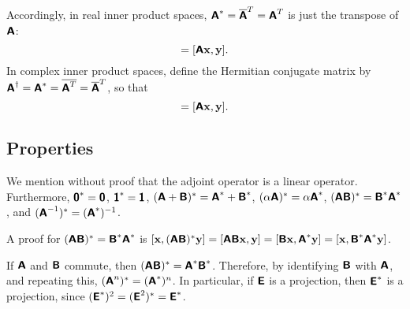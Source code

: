 Accordingly, in real inner product spaces,
$\textsf{\textbf{A}}^\ast= \overline{\textsf{\textbf{A}}}^T =  \textsf{\textbf{A}}^T$ is just the transpose of $\textsf{\textbf{A}}$:
\begin{equation}
[{\bf x},\textsf{\textbf{A}}^T{\bf y}]=
[\textsf{\textbf{A}}{\bf x},{\bf y}].
\end{equation}
In complex inner product spaces,
define the Hermitian conjugate matrix by
$\textsf{\textbf{\textsf{\textbf{A}}}}^\dagger = \textsf{\textbf{A}}^\ast =\overline{\textsf{\textbf{A}}^T} = \overline{\textsf{\textbf{A}}}^T$, so that
\begin{equation}
[{\bf x},\textsf{\textbf{A}}^\dagger{\bf y}]=
[\textsf{\textbf{A}}{\bf x},{\bf y}].
\end{equation}


\subsection{Properties}
We mention without proof that the adjoint operator is a linear operator.
Furthermore,
$\textsf{\textbf{0}}^\ast = \textsf{\textbf{0}}$,
$\textsf{\textbf{1}}^\ast = \textsf{\textbf{1}}$,
$(\textsf{\textbf{A}}+\textsf{\textbf{B}})^\ast = \textsf{\textbf{A}}^\ast+\textsf{\textbf{B}}^\ast$,
$(\alpha \textsf{\textbf{A}})^\ast = \alpha \textsf{\textbf{A}}^\ast$,
$( \textsf{\textbf{A}}\textsf{\textbf{B}})^\ast =   \textsf{\textbf{B}}^\ast
 \textsf{\textbf{A}}^\ast$,
and
$( \textsf{\textbf{A}}^{-1})^\ast
=
( \textsf{\textbf{A}}^\ast )^{-1}
$.

{\color{OliveGreen}\bproof
A proof for
$( \textsf{\textbf{A}}\textsf{\textbf{B}})^\ast =   \textsf{\textbf{B}}^\ast  \textsf{\textbf{A}}^\ast
$
is
$
[{\bf x},(\textsf{\textbf{A}}\textsf{\textbf{B}})^\ast {\bf y}]
=
[\textsf{\textbf{A}}\textsf{\textbf{B}}{\bf x}, {\bf y}]
=
[\textsf{\textbf{B}}{\bf x}, \textsf{\textbf{A}}^\ast{\bf y}]
=
[{\bf x}, \textsf{\textbf{B}}^\ast\textsf{\textbf{A}}^\ast{\bf y}]
$.
\eproof
}

If $\textsf{\textbf{A}}$ and $\textsf{\textbf{B}}$ commute, then
$
( \textsf{\textbf{A}}\textsf{\textbf{B}})^\ast = \textsf{\textbf{A}}^\ast   \textsf{\textbf{B}}^\ast
$.
Therefore, by identifying $\textsf{\textbf{B}}$ with $\textsf{\textbf{A}}$, and repeating this,
$( \textsf{\textbf{A}}^n)^\ast =  (\textsf{\textbf{A}}^\ast)^n$.
In particular, if
$\textsf{\textbf{E}}$
is a projection,
then
$\textsf{\textbf{E}}^\ast$ is a projection, since
$ (\textsf{\textbf{E}}^\ast)^2 =  ( \textsf{\textbf{E}}^2)^\ast  =\textsf{\textbf{E}}^\ast$.

